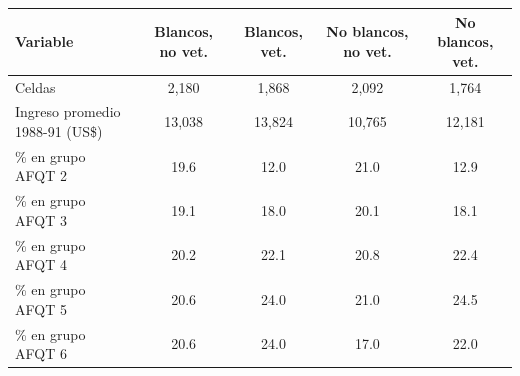 
\begin{tabular}{lcccc}
\toprule
Variable & Blancos, no vet. & Blancos, vet. & No blancos, no vet. & No blancos, vet.\\
\midrule
Celdas & 2,180 & 1,868 & 2,092 & 1,764\\
Ingreso promedio 1988-91 (US\$) & 13,038 & 13,824 & 10,765 & 12,181\\
\% en grupo AFQT 2 & 19.6 & 12.0 & 21.0 & 12.9\\
\% en grupo AFQT 3 & 19.1 & 18.0 & 20.1 & 18.1\\
\% en grupo AFQT 4 & 20.2 & 22.1 & 20.8 & 22.4\\
\% en grupo AFQT 5 & 20.6 & 24.0 & 21.0 & 24.5\\
\% en grupo AFQT 6 & 20.6 & 24.0 & 17.0 & 22.0\\
\bottomrule
\end{tabular}
